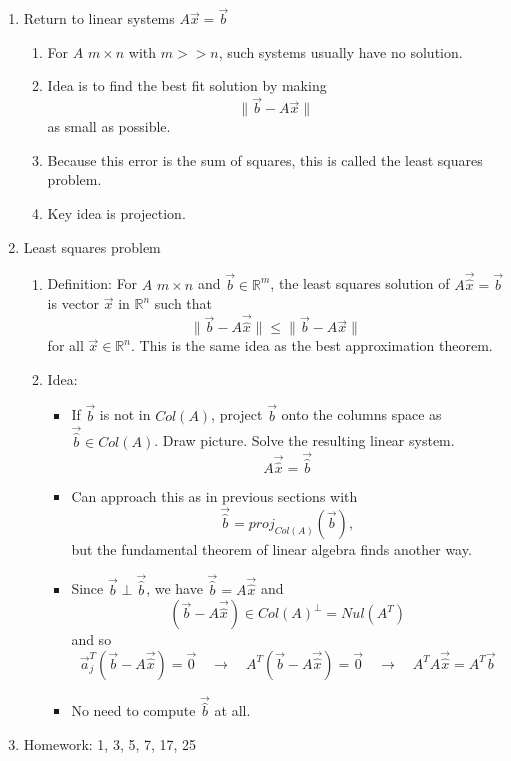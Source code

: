 \documentclass{article}
\begin{document}
\begin{enumerate}

\item Return to linear systems $A \vec{x} = \vec{b}$
\begin{enumerate}
\item For $A$ $m \times n$ with $m >> n$, such systems usually have no solution.
\item Idea is to find the best fit solution by making
\[
\| \vec{b} - A \vec{x} \|
\]
as small as possible.
\item Because this error is the sum of squares, this is called the least squares problem.
\item Key idea is projection.
\end{enumerate}


\item Least squares problem
\begin{enumerate}
\item Definition: For $A$ $m \times n$ and $\vec{b} \in \mathbb{R}^m$, the least squares solution of $A \vec{\hat{x}} = \vec{b}$ is vector $\vec{x}$ in $\mathbb{R}^n$ such that
\[
\| \vec{b} - A \vec{\hat{x}} \| \leq \| \vec{b} - A \vec{x} \|
\]
for all $\vec{x} \in \mathbb{R}^n$. This is the same idea as the best approximation theorem.

\item Idea:
\begin{itemize}
\item If $\vec{b}$ is not in $Col(A)$, project $\vec{b}$ onto the columns space as $\vec{\hat{b}} \in Col(A)$. Draw picture. Solve the resulting linear system.
\[
A \vec{\hat{x}} = \vec{\hat{b}}
\]
\item Can approach this as in previous sections with 
\[
\vec{\hat{b}} = proj_{Col(A)} (\vec{b}),
\]
but the fundamental theorem of linear algebra finds another way.
\item Since $\vec{b} \perp \vec{\hat{b}}$, we have $\vec{\hat{b}} = A \vec{\hat{x}}$ and 
\[
(\vec{b} - A \vec{\hat{x}}) \in Col(A)^{\perp} = Nul(A^T)
\]
and so
\[
\vec{a}_j^T(\vec{b} - A \vec{\hat{x}}) = \vec{0} \quad\rightarrow\quad
A^T(\vec{b} - A \vec{\hat{x}}) = \vec{0} \quad\rightarrow \quad
A^T A \vec{\hat{x}} = A^T \vec{b}
\]
\item No need to compute $\vec{\hat{b}}$ at all.
\end{itemize}
\end{enumerate}


\item Homework: 1, 3, 5, 7, 17, 25

\end{enumerate}
\end{document}
